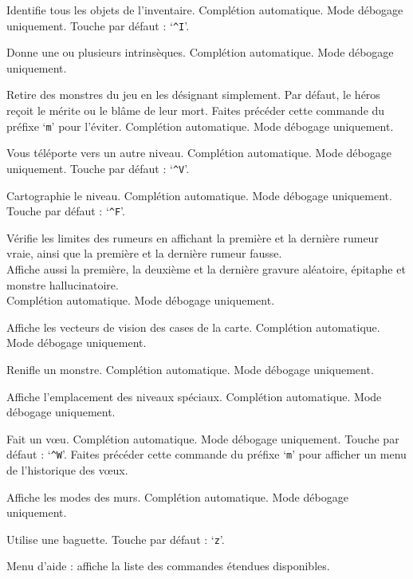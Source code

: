 \documentclass[titlepage]{article}
\begin{document}
\begin{description}[font=\mdseries\ttfamily]
\item[\#wizidentify]
Identifie tous les objets de l'inventaire.
Complétion automatique.
Mode débogage uniquement.
Touche par défaut : `\texttt{\textasciicircum I}'.
\item[\#wizintrinsic]
Donne une ou plusieurs intrinsèques.
Complétion automatique.
Mode débogage uniquement.
\item[\#wizkill]
Retire des monstres du jeu en les désignant simplement.
Par défaut, le héros reçoit le mérite ou le blâme de leur mort.
Faites précéder cette commande du préfixe `\texttt{m}' pour l'éviter.
Complétion automatique.
Mode débogage uniquement.
\item[\#wizlevelport]
Vous téléporte vers un autre niveau.
Complétion automatique.
Mode débogage uniquement.
Touche par défaut : `\texttt{\textasciicircum V}'.
\item[\#wizmap]
Cartographie le niveau.
Complétion automatique.
Mode débogage uniquement.
Touche par défaut : `\texttt{\textasciicircum F}'.
\item[\#wizrumorcheck]
Vérifie les limites des rumeurs en affichant la première et la dernière rumeur
vraie, ainsi que la première et la dernière rumeur fausse.\\
Affiche aussi la première, la deuxième et la dernière gravure aléatoire, épitaphe
et monstre hallucinatoire.\\
Complétion automatique.
Mode débogage uniquement.
\item[\#wizseenv]
Affiche les vecteurs de vision des cases de la carte.
Complétion automatique.
Mode débogage uniquement.
\item[\#wizsmell]
Renifle un monstre.
Complétion automatique.
Mode débogage uniquement.
\item[\#wizwhere]
Affiche l'emplacement des niveaux spéciaux.
Complétion automatique.
Mode débogage uniquement.
\item[\#wizwish]
Fait un vœu.
Complétion automatique.
Mode débogage uniquement.
Touche par défaut : `\texttt{\textasciicircum W}'.
Faites précéder cette commande du préfixe `\texttt{m}' pour afficher un menu de l'historique des vœux.
\item[\#wmode]
Affiche les modes des murs.
Complétion automatique.
Mode débogage uniquement.
\item[\#zap]
Utilise une baguette. Touche par défaut : `\texttt{z}'.
\item[\#?]
Menu d'aide : affiche la liste des commandes étendues disponibles.
\end{description}
\end{document}
